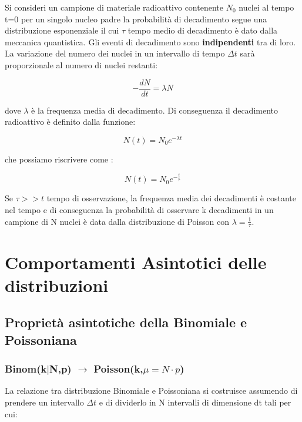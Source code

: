Si consideri un campione di materiale radioattivo contenente $N_{0}$ nuclei al tempo t=0 per un singolo nucleo padre la probabilit\`{a} di decadimento segue una distribuzione esponenziale il cui $\tau$ tempo medio di decadimento \`{e} dato dalla meccanica quantistica. Gli eventi di decadimento sono \textbf{indipendenti} tra di loro.
\newline
La variazione del numero dei nuclei in un intervallo di tempo $\Delta t$ sar\`{a} proporzionale al numero di nuclei restanti:

\begin{equation}
	-\dfrac{dN}{dt} = \lambda N
\end{equation}

dove $\lambda$ \`{e} la frequenza media di decadimento. Di conseguenza il decadimento radioattivo \`{e} definito dalla funzione:

\begin{equation}
	N(t) = N_{0}e^{-\lambda t}
\end{equation}

che possiamo riscrivere come :

\begin{equation}
	N(t) = N_{0} e^{-\frac{t}{\tau}}
\end{equation}

Se $\tau >> t$ tempo di osservazione, la frequenza media dei decadimenti \`{e} costante nel tempo e di conseguenza la probabilit\`{a} di osservare k decadimenti in un campione di N nuclei \`{e} data dalla distribuzione di Poisson con $\lambda = \frac{1}{\tau}$.

\section{Comportamenti Asintotici delle distribuzioni}

\subsection{Propriet\`{a} asintotiche della Binomiale e Poissoniana}

\subsubsection{Binom(k$\vert$N,p) $\rightarrow$ Poisson(k,$\mu = N \cdot p$)}
La relazione tra distribuzione Binomiale e Poissoniana si costruisce assumendo di prendere un intervallo $\Delta t$ e di dividerlo in N intervalli di dimensione dt tali per cui:

